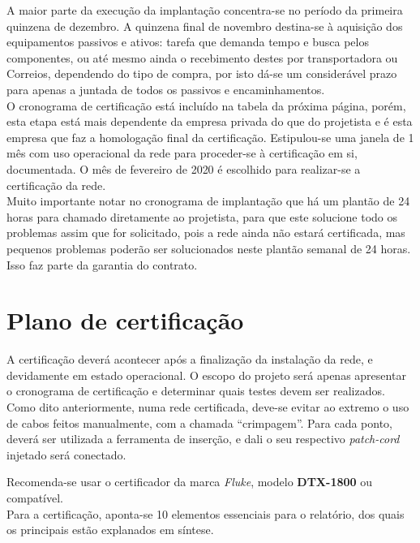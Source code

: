 \documentclass[	DIV=calc,%
							paper=a4,%
							fontsize=12pt,%
							onecolumn]{scrartcl}	 					%
\begin{document}
A maior parte da execução da implantação concentra-se no período da primeira quinzena de dezembro. A quinzena final de novembro destina-se à aquisição dos equipamentos passivos e ativos: tarefa que demanda tempo e busca pelos componentes, ou até mesmo ainda o recebimento destes por transportadora ou Correios, dependendo do tipo de compra, por isto dá-se um considerável prazo para apenas a juntada de todos os passivos e encaminhamentos.
\\

O cronograma de certificação está incluído na tabela da próxima página, porém, esta etapa está mais dependente da empresa privada do que do projetista e é esta empresa que faz a homologação final da certificação. Estipulou-se uma janela de 1 mês com uso operacional da rede para proceder-se à certificação em si, documentada. O mês de fevereiro de 2020 é escolhido para realizar-se a certificação da rede.
\\

Muito importante notar no cronograma de implantação que há um plantão de 24 horas para chamado diretamente ao projetista, para que este solucione todo os problemas assim que for solicitado, pois a rede ainda não estará certificada, mas pequenos problemas poderão ser solucionados neste plantão semanal de 24 horas. Isso faz parte da garantia do contrato.


 


\section{Plano de certificação}

A certificação deverá acontecer após a finalização da instalação da rede, e devidamente em estado operacional. O escopo do projeto será apenas apresentar o cronograma de certificação e determinar quais testes devem ser realizados.
\\

Como dito anteriormente, numa rede certificada, deve-se evitar ao extremo o uso de cabos feitos manualmente, com a chamada ``crimpagem''. Para cada ponto, deverá ser utilizada a ferramenta de inserção, e dali o seu respectivo \textit{patch-cord} injetado será conectado.

Recomenda-se usar o certificador da marca \textit{Fluke}, modelo \textbf{DTX-1800 
}ou compatível.
\\

Para a certificação, aponta-se 10 elementos essenciais para o relatório, dos quais os principais estão explanados em síntese.
\\
\end{document}
